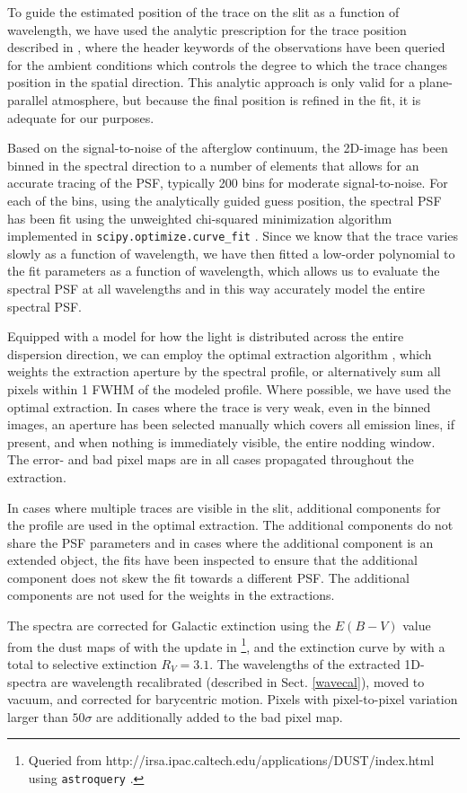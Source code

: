 \documentclass[longauth]{aa}    %
\begin{document}
To guide the estimated position of the trace on the slit as a function of
wavelength, we have used the analytic prescription for the trace position
described in \citet{Filippenko1982}, where the header keywords of the
observations have been queried for the ambient conditions which controls the
degree to which the trace changes position in the spatial direction. This
analytic approach is only valid for a plane-parallel atmosphere, but because the
final position is refined in the fit, it is adequate for our purposes.

Based on the signal-to-noise of the afterglow continuum, the 2D-image has been
binned in the spectral direction to a number of elements that allows for an
accurate tracing of the PSF, typically 200 bins for moderate signal-to-noise.
For each of the bins, using the analytically guided guess position, the spectral
PSF has been fit using the unweighted chi-squared minimization algorithm
implemented in \texttt{scipy.optimize.curve\_fit} \citep{scipy}. Since we know
that the trace varies slowly as a function of wavelength, we have then fitted a
low-order polynomial to the fit parameters as a function of wavelength, which
allows us to evaluate the spectral PSF at all wavelengths and in this way
accurately model the entire spectral PSF.

Equipped with a model for how the light is distributed across the entire
dispersion direction, we can  employ the optimal extraction algorithm
\citep{Horne1986}, which weights the extraction aperture by the spectral profile,
or alternatively sum all pixels within 1 FWHM of the modeled profile. Where
possible, we have used the optimal extraction. In cases where the trace is very
weak, even in the binned images, an aperture has been selected manually which
covers all emission lines, if present, and when nothing is immediately visible, the
entire nodding window. The error- and bad pixel maps are in all cases propagated
throughout the extraction.

In cases where multiple traces are visible in the slit, additional components
for the profile are used in the optimal extraction. The additional components do
not share the PSF parameters and in cases where the additional component is an
extended object, the fits have been inspected to ensure that the additional
component does not skew the fit towards a different PSF. The additional
components are not used for the weights in the extractions.

The spectra are corrected for Galactic extinction using the $E(B-V)$ value from
the dust maps of \citet{Schlegel1998} with the update in
\citet{Schlafly2011}\footnote{Queried from
	http://irsa.ipac.caltech.edu/applications/DUST/index.html using
	\texttt{astroquery} \citep{astroquery}.}, and the extinction curve by
\cite{Cardelli1989} with a total to selective extinction $R_V = 3.1$. The
wavelengths of the extracted 1D-spectra are wavelength recalibrated (described
in Sect. \ref{wavecal}), moved to vacuum, and corrected for barycentric motion.
Pixels with pixel-to-pixel variation larger than $50 \sigma$ are additionally
added to the bad pixel map.
\end{document}
